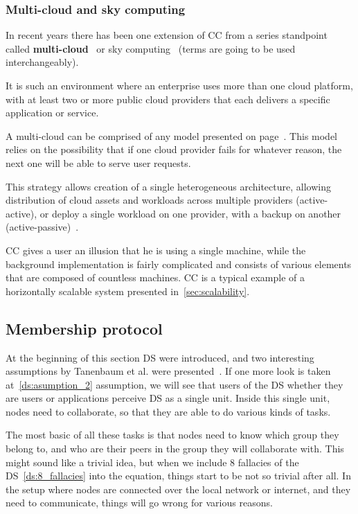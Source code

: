 \subsubsection{Multi-cloud and sky computing}
%
In recent years there has been one extension of CC from a series standpoint called \textbf{multi-cloud}~\cite{HongDSH19, Ardagna15} or sky computing~\cite{StoicaS21} (terms are going to be used interchangeably). 

It is such an environment where an enterprise uses more than one cloud platform, with at least two or more public cloud providers that each delivers a specific application or service. 

A multi-cloud can be comprised of any model presented on page~\pageref{sec_types}. This model relies on the possibility that if one cloud provider fails for whatever reason, the next one will be able to serve user requests.

This strategy allows creation of a single heterogeneous architecture, allowing distribution of cloud assets and workloads across multiple providers (active-active), or deploy a single workload on one provider, with a backup on another (active-passive)~\cite{Multicloud2019}.

CC gives a user an illusion that he is using a single machine, while the background implementation is fairly complicated and consists of various elements that are composed of countless machines. CC is a typical example of a horizontally scalable system presented in~\ref{sec:scalability}.
%
%
\subsection{Membership protocol}\label{sec:memership_protocol}
%
At the beginning of this section DS were introduced, and two interesting assumptions by Tanenbaum et al. were presented~\cite{SteenT16, 0019513}. If one more look is taken at~\ref{ds:asumption_2} assumption, we will see that users of the DS whether they are users or applications perceive DS as a single unit. Inside this single unit, nodes need to collaborate, so that they are able to do various kinds of tasks.

The most basic of all these tasks is that nodes need to know which group they belong to, and who are their peers in the group they will collaborate with. This might sound like a trivial idea, but when we include 8 fallacies of the DS~\ref{ds:8_fallacies} into the equation, things start to be not so trivial after all. In the setup where nodes are connected over the local network or internet, and they need to communicate, things will go wrong for various reasons.

